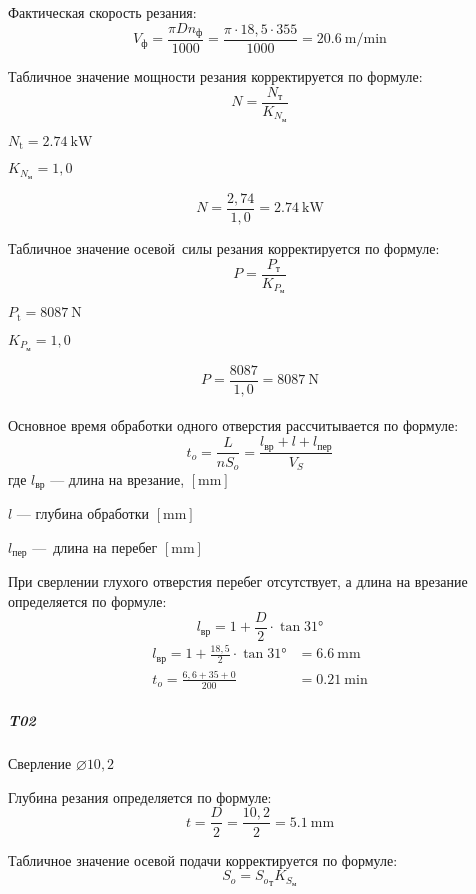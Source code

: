 \documentclass[14pt,russian,a4paper]{extreport}
\begin{document}
Фактическая скорость резания:
$$ V_\text{ф} = \frac{\pi D n_\text{ф}}{1000} = \frac{\pi \cdot 18,5 \cdot 355}{1000} = \SI{20,6}{\meter\per\minute} $$

Табличное значение мощности резания корректируется по формуле:
$$ N = \frac{N_\text{т}}{K_{N_\text{м}}} $$

$ N_\text{t} = \SI{2,74}{\kilo\watt} $ \cite[карта 46]{guzeev:rr} \par
$ K_{N_\text{м}} = 1,0 $ \cite[карта 53]{guzeev:rr}

$$ N = \frac{2,74}{1,0} = \SI{2,74}{\kilo\watt} $$

Табличное значение осевой силы резания корректируется по формуле:
$$ P = \frac{P_\text{т}}{K_{P_\text{м}}} $$

$ P_\text{t} = \SI{8087}{\newton} $ \cite[карта 46]{guzeev:rr} \par
$ K_{P_\text{м}} = 1,0 $ \cite[карта 53]{guzeev:rr}

$$ P = \frac{8087}{1,0} = \SI{8087}{\newton} $$ \\

Основное время обработки одного отверстия рассчитывается по формуле:
\begin{equation*}
  t_o = \frac{L}{n S_o} = \frac{l_\text{вр} + l + l_\text{пер}}{V_S}
\end{equation*}
где $l_\text{вр}$ --- длина на врезание, $\left[\si{\milli\meter}\right]$ \par
$l$ --- глубина обработки $\left[\si{\milli\meter}\right]$ \par
$l_\text{пер}$ --- длина на перебег $\left[\si{\milli\meter}\right]$

При сверлении глухого отверстия перебег отсутствует, а длина на врезание определяется по формуле:
\begin{equation*}
  l_\text{вр} = 1 + \frac{D}{2} \cdot \tan{\ang{31}}
\end{equation*}
\begin{align*}
    l_\text{вр} = 1 + \frac{18,5}{2} \cdot \tan{\ang{31}} &= \SI{6,6}{\milli\meter} \\
    t_o = \frac{6,6 + 35 + 0}{200} &= \SI{0,21}{\minute}
\end{align*}


\subparagraph{T02} Сверление $\diameter 10,2$ \

Глубина резания определяется по формуле:
$$ t = \frac{D}{2} = \frac{10,2}{2} = \SI{5,1}{\milli\meter} $$

Табличное значение осевой подачи корректируется по формуле:
$$ S_o = {S_o}_\text{т} K_{S_\text{м}} $$
\end{document}
